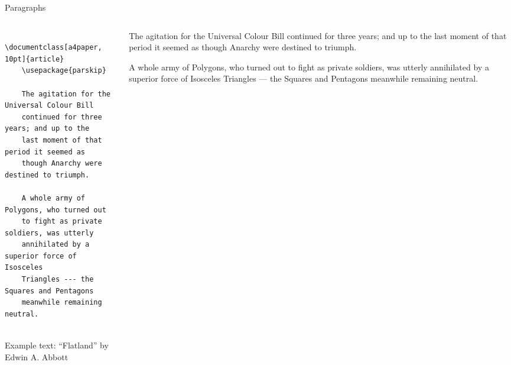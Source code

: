 \copyrightTim

\begin{frame}[fragile, t]{Paragraphs}
	\begin{columns}[t]
        \begin{column}{0.5\textwidth}
	\begin{verbatim} 
	\documentclass[a4paper, 10pt]{article}
	\usepackage{parskip}
	
	The agitation for the Universal Colour Bill 
	continued for three years; and up to the 
	last moment of that period it seemed as 
	though Anarchy were destined to triumph.

	A whole army of Polygons, who turned out 
	to fight as private soldiers, was utterly 
	annihilated by a superior force of Isosceles 
	Triangles --- the Squares and Pentagons 
	meanwhile remaining neutral.
	
	\end{verbatim}
	{\tiny
	Example text: ``Flatland''
	by Edwin A. Abbott
	}\par
	\end{column}
	\begin{column}{0.5\textwidth}
	\vspace{0pt}
	\begin{tcolorbox}\small \setlength\parindent{0pt}
	The agitation for the Universal Colour Bill continued for three years; 
	and up to the last moment of that period it seemed as though Anarchy 
	were destined to triumph.
	\newline
	
	A whole army of Polygons, who turned out to fight as private soldiers, 
	was utterly annihilated by a superior force of Isosceles 
	Triangles --- the Squares and Pentagons meanwhile remaining neutral.
	\end{tcolorbox}
\end{column}
\end{columns}

\end{frame}
